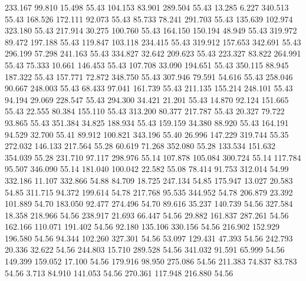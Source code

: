  233.167   99.810   15.498        55.43
 104.153   83.901  289.504        55.43
  13.285    6.227  340.513        55.43
 168.526  172.111   92.073        55.43
  85.733   78.241  291.703        55.43
 135.639  102.974  323.180        55.43
 217.914   30.275  100.760        55.43
 164.150  150.194   48.949        55.43
 319.972   89.472  197.188        55.43
 119.847  103.118  234.415        55.43
 319.912  157.653  342.691        55.43
 296.199   57.298  241.163        55.43
 334.827   32.642  209.623        55.43
 223.327   83.822  264.991        55.43
  75.333   10.661  146.453        55.43
 107.708   33.090  194.651        55.43
 350.115   88.945  187.322        55.43
 157.771   72.872  348.750        55.43
 307.946   79.591   54.616        55.43
 258.046   90.667  248.003        55.43
  68.433   97.041  161.739        55.43
 211.135  155.214  248.101        55.43
  94.194   29.069  228.547        55.43
 294.300   34.421   21.201        55.43
  14.870   92.124  151.665        55.43
  22.555   80.384  155.110        55.43
 313.200   80.377  217.787        55.43
  20.327   79.722   93.865        55.43
 351.384   34.825  188.934        55.43
 159.159   34.380   88.920        55.43
 164.191   94.529   32.700        55.41
  89.912  100.821  343.196        55.40
  26.996  147.229  319.744        55.35
 272.032  146.133  217.564        55.28
  60.619   71.268  352.080        55.28
 133.534  151.632  354.039        55.28
 231.710   97.117  298.976        55.14
 107.878  105.084  300.724        55.14
 117.784   95.507  346.090        55.14
 181.040  100.042   22.582        55.08
  78.414   91.753  312.014        54.99
 332.186   11.107  332.866        54.88
  84.709   18.725  247.134        54.85
 175.947   13.027   20.583        54.85
 311.715   94.372  199.614        54.78
 217.768   95.535  344.952        54.78
 206.879   23.392  101.889        54.70
 183.050   92.477  274.496        54.70
  89.616   35.237  140.739        54.56
 327.584   18.358  218.966        54.56
 238.917   21.693   66.447        54.56
  29.882  161.837  287.261        54.56
 162.166  110.071  191.402        54.56
  92.180  135.106  330.156        54.56
 216.902  152.929  196.580        54.56
  94.344  102.260  327.301        54.56
  53.097  129.431   47.393        54.56
 242.793   20.336   32.622        54.56
 244.803   15.710  289.528        54.56
 341.032   91.591   65.999        54.56
 149.399  159.052   17.100        54.56
 179.916   98.950  275.086        54.56
 211.383   74.837   83.783        54.56
   3.713   84.910  141.053        54.56
 270.361  117.948  216.880        54.56
